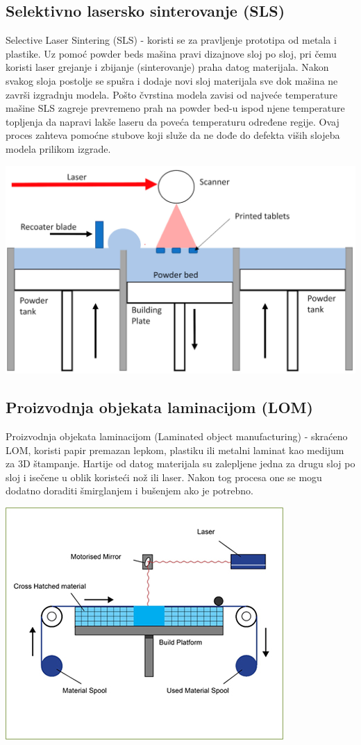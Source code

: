 \documentclass[a4paper]{article}
\begin{document}
{\bigbreak
\bigbreak

\subsection{Selektivno lasersko sinterovanje (SLS)}
\label{subsec:podnaslov4}
Selective Laser Sintering (SLS) - koristi se za pravljenje prototipa od metala i plastike. Uz pomoć powder beds mašina pravi dizajnove sloj po sloj, pri čemu koristi  laser grejanje i zbijanje (sinterovanje) praha datog materijala. 
\bigbreak Nakon svakog sloja postolje se spušra i dodaje novi sloj materijala sve dok mašina ne završi izgradnju modela. Pošto čvrstina modela zavisi od najveće temperature mašine SLS zagreje prevremeno prah na powder bed-u ispod njene temperature topljenja da napravi lakše laseru da poveća temperaturu određene regije. 
\bigbreak Ovaj proces zahteva pomoćne stubove koji služe da ne dođe do defekta viših slojeba modela prilikom izgrade.

\begin{center}
\includegraphics[width=.5\textwidth ]{Tehnikeslike/Sls.png}
\end{center}
\newpage
\subsection{Proizvodnja objekata laminacijom (LOM)}
\label{subsec:podnaslov5}
Proizvodnja objekata laminacijom (Laminated object manufacturing) - skraćeno LOM, koristi papir premazan lepkom, plastiku ili metalni laminat kao medijum za 3D štampanje. 
\bigbreak Hartije od datog materijala su zalepljene jedna za drugu sloj po sloj i isečene u oblik koristeći nož ili laser. Nakon tog procesa one se mogu dodatno doraditi šmirglanjem i bušenjem ako je potrebno.

\begin{center}
\includegraphics[width=.5\textwidth ]{Tehnikeslike/LOM.jpg}
\end{center}

}
\end{document}
